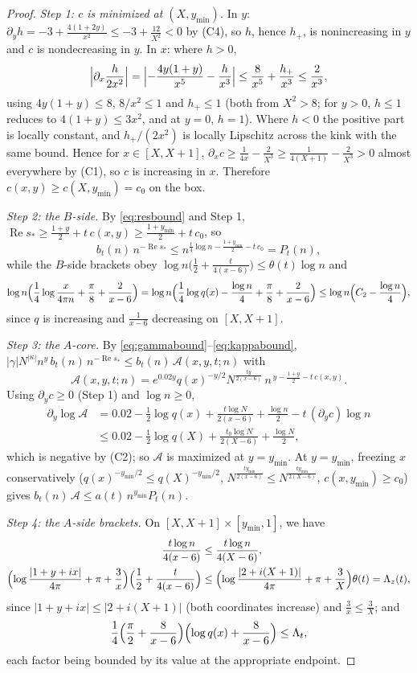 \documentclass[11pt]{article}
\theoremstyle{definition}
\DeclareMathOperator{\Rea}{Re}
\begin{document}
\begin{proof}
\emph{Step 1: $c$ is minimized at $(X,y_{\min})$.} In $y$:
$\partial_yh=-3+\frac{4(1+2y)}{x^2}\le-3+\frac{12}{X^2}<0$ by (C4),
so $h$, hence $h_+$, is nonincreasing in $y$ and $c$ is
nondecreasing in $y$. In $x$: where $h>0$,
\[
\Bigl|\partial_x\frac{h}{2x^2}\Bigr|
=\Bigl|-\frac{4y(1+y)}{x^5}-\frac{h}{x^3}\Bigr|
\le\frac{8}{x^5}+\frac{h_+}{x^3}\le\frac2{x^3},
\]
using $4y(1+y)\le8$, $8/x^2\le1$ and $h_+\le1$ (both from
$X^2>8$; for $y>0$, $h\le1$ reduces to $4(1+y)\le3x^2$, and at
$y=0$, $h=1$). Where $h<0$ the positive part is locally constant,
and $h_+/(2x^2)$ is locally Lipschitz across the kink with the same
bound. Hence for $x\in[X,X+1]$,
$\partial_xc\ge\frac1{4x}-\frac2{X^3}
\ge\frac1{4(X+1)}-\frac2{X^3}>0$ almost everywhere by (C1), so $c$
is increasing in $x$. Therefore $c(x,y)\ge c(X,y_{\min})=c_0$ on
the box.

\emph{Step 2: the $B$-side.} By \eqref{eq:resbound} and Step 1,
$\Rea s_*\ge\frac{1+y}2+t\,c(x,y)\ge\frac{1+y_{\min}}2+t\,c_0$, so
\[
b_t(n)\,n^{-\Rea s_*}
\le n^{\frac t4\log n-\frac{1+y_{\min}}2-t\,c_0}=P_t(n),
\]
while the $B$-side brackets obey
$\log n\bigl(\frac12+\frac t{4(x-6)}\bigr)\le\theta(t)\log n$ and
\[
\log n\Bigl(\frac14\log\frac x{4\pi n}+\frac\pi8+\frac2{x-6}\Bigr)
=\log n\Bigl(\frac14\log q(x)-\frac{\log n}4+\frac\pi8
+\frac2{x-6}\Bigr)
\le\log n\Bigl(C_2-\frac{\log n}4\Bigr),
\]
since $q$ is increasing and $\frac1{x-6}$ decreasing on $[X,X+1]$.

\emph{Step 3: the $A$-core.} By
\eqref{eq:gammabound}--\eqref{eq:kappabound},
$|\gamma|N^{|\kappa|}n^y\,b_t(n)\,n^{-\Rea s_*}\le
b_t(n)\,\mathcal A(x,y,t;n)$ with
\[
\mathcal A(x,y,t;n)
=e^{0.02y}q(x)^{-y/2}N^{\frac{ty}{2(x-6)}}\,
n^{\,y-\frac{1+y}2-t\,c(x,y)} .
\]
Using $\partial_yc\ge0$ (Step 1) and $\log n\ge0$,
\[
\begin{aligned}
\partial_y\log\mathcal A
&=0.02-\frac12\log q(x)+\frac{t\log N}{2(x-6)}
+\frac{\log n}2-t\,(\partial_yc)\log n\\
&\le0.02-\frac12\log q(X)
+\frac{t_0\log N}{2(X-6)}+\frac{\log N}2,
\end{aligned}
\]
which is negative by (C2); so $\mathcal A$ is maximized at
$y=y_{\min}$. At $y=y_{\min}$, freezing $x$ conservatively
($q(x)^{-y_{\min}/2}\le q(X)^{-y_{\min}/2}$,
$N^{\frac{ty_{\min}}{2(x-6)}}\le N^{\frac{ty_{\min}}{2(X-6)}}$,
$c(x,y_{\min})\ge c_0$) gives
$b_t(n)\,\mathcal A\le a(t)\,n^{y_{\min}}P_t(n)$.

\emph{Step 4: the $A$-side brackets.} On $[X,X+1]\times[y_{\min},1]$, we have
\begin{align*}
\frac{t\log n}{4(x-6)} &\le \frac{t\log n}{4(X-6)},
\\
\Bigl(\log\frac{|1+y+ix|}{4\pi}+\pi+\frac3x\Bigr)
\Bigl(\frac12+\frac t{4(x-6)}\Bigr)
&\le \Bigl(\log\frac{|2+i(X+1)|}{4\pi}+\pi+\frac3X\Bigr)
\theta(t)=\Lambda_z(t),
\end{align*}
since $|1+y+ix|\le|2+i(X+1)|$ (both coordinates increase) and
$\frac3x\le\frac3X$; and
\[
\frac14\Bigl(\frac\pi2+\frac8{x-6}\Bigr)
\Bigl(\log q(x)+\frac8{x-6}\Bigr)\le\Lambda_t,
\]
each factor being bounded by its value at the appropriate endpoint.


\end{proof}
\end{document}
